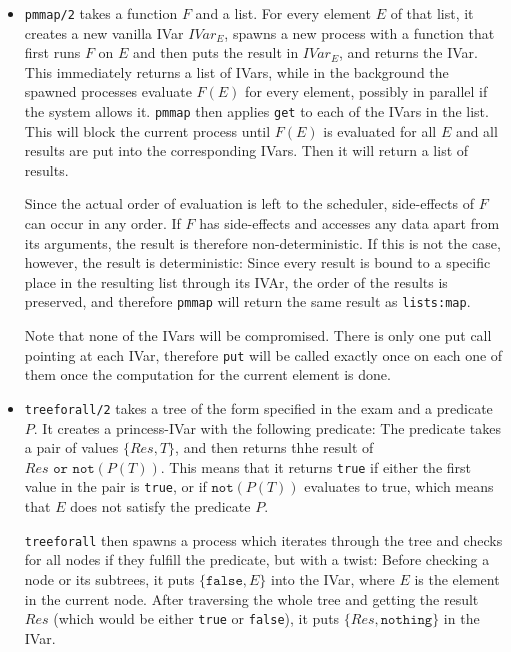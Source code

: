 \documentclass[a4paper]{article}
\begin{document}
\begin{itemize}
  \item \texttt{pmmap/2} takes a function $F$  and a list. For every element $E$ of that list, it creates a new vanilla IVar $IVar_E$, spawns a new process with a function that first runs $F$ on $E$ and then puts the result in $IVar_E$, and returns the IVar. This immediately returns a list of IVars, while in the background the spawned processes evaluate $F(E)$ for every element, possibly in parallel if the system allows it. \texttt{pmmap} then applies \texttt{get} to each of the IVars in the list. This will block the current process until $F(E)$ is evaluated for all $E$ and all results are put into the corresponding IVars. Then it will return a list of results. 
  
  Since the actual order of evaluation is left to the scheduler, side-effects of $F$ can occur in any order. If $F$ has side-effects and accesses any data apart from its arguments, the result is therefore non-deterministic. If this is not the case, however, the result is deterministic: Since every result is bound to a specific place in the resulting list through its IVAr, the order of the results is preserved, and therefore \texttt{pmmap} will return the same result as \texttt{lists:map}.
  
  Note that none of the IVars will be compromised. There is only one put call pointing at each IVar, therefore \texttt{put} will be called exactly once on each one of them once the computation for the current element is done.
  \item \texttt{treeforall/2} takes a tree of the form specified in the exam and a predicate $P$. It creates a princess-IVar with the following predicate: The predicate takes a pair of values $\{Res, T\}$, and then returns thhe result of $Res \texttt{ or not}(P(T))$. This means that it returns \texttt{true} if either the first value in the pair is \texttt{true}, or if $\texttt{not}(P(T))$ evaluates to true, which means that $E$ does not satisfy the predicate $P$.
  
  \texttt{treeforall} then spawns a process which iterates through the tree and checks for all nodes if they fulfill the predicate, but with a twist: Before checking a node or its subtrees, it puts $\{\texttt{false}, E\}$ into the IVar, where $E$ is the element in the current node. After traversing the whole tree and getting the result $Res$ (which would be either \texttt{true} or \texttt{false}), it puts $\{Res, \texttt{nothing}\}$ in the IVar.
  

\end{itemize}
\end{document}
